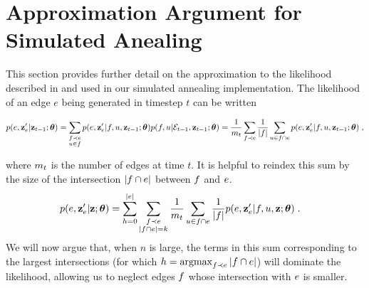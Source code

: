 \documentclass[aps,pre,reprint,superscriptaddress,nofootinbib]{revtex4-2}
\begin{document}
    \section{Approximation Argument for Simulated Anealing}\label{sec:simulated-annealing-approximation}

        This section provides further detail on the approximation to the likelihood described in  and used in our simulated annealing implementation. 
        The likelihood of an edge $e$ being generated in timestep $t$ can be written 
        \begin{widetext}    
            \begin{align}
                p(e, \mathbf{z}_e'|\mathbf{z}_{t-1};\boldsymbol{\theta}) = \sum_{\substack{f \prec e \\ u\in f}} p(e, \mathbf{z}_e' | f, u, \mathbf{z}_{t-1}; \boldsymbol{\theta}) p(f,u | \mathcal{E}_{t-1}, \mathbf{z}_{t-1}; \boldsymbol{\theta}) = \frac{1}{m_{t}}\sum_{f \prec e}  \frac{1}{|f|} \sum_{u \in f \cap e} p(e, \mathbf{z}_e' | f, u, \mathbf{z}_{t-1}; \boldsymbol{\theta}) \;,
            \end{align} 
        \end{widetext}
        where $m_{t}$ is the number of edges at time $t$.
        It is helpful to reindex this sum by the size of the intersection $|f \cap e|$ between $f$ and $e$. 
        \begin{align}
            p(e, \mathbf{z}_e'|\mathbf{z};\boldsymbol{\theta}) &= \sum_{h=0}^{|e|} \sum_{\substack{f \prec e \\ |f \cap e| = k}} \frac{1}{m_{t}}\sum_{u \in f \cap e} \frac{1}{|f|} p(e,\mathbf{z}_e' | f, u, \mathbf{z}; \boldsymbol{\theta}) \;.
        \end{align}
        We will now argue that, when $n$ is large, the terms in this sum corresponding to the largest intersections (for which $h = \operatorname*{argmax} _{f \prec e} |f \cap e|$) will dominate the likelihood, allowing us to neglect edges $f$ whose intersection with $e$ is smaller.
\end{document}
